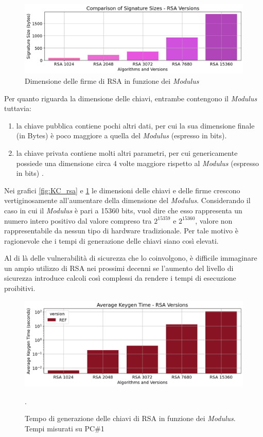 \begin{figure}[H]
    \centering
    \includegraphics[width=1\textwidth]{Immagini/20240822_i9/Message_IO/IO_rsa.png}
    \caption{Dimensione delle firme di RSA in funzione dei \textit{Modulus}}
    \label{fig:IO_rsa}
\end{figure}

Per quanto riguarda la dimensione delle chiavi, entrambe contengono il \textit{Modulus} tuttavia:
\begin{enumerate}
    \item la chiave pubblica contiene pochi altri dati, per cui la sua dimensione finale (in Bytes) è poco maggiore a quella del \textit{Modulus} (espresso in bits).
    \item la chiave privata contiene molti altri parametri, per cui genericamente possiede una dimensione circa 4 volte maggiore rispetto al \textit{Modulus} (espresso in bits) \cite{stackexchange_rsa_2015}.
\end{enumerate}

Nei grafici \ref{fig:KC_rsa} e \ref{fig:IO_rsa} le dimensioni delle chiavi e delle firme crescono vertiginosamente all'aumentare della dimensione del \textit{Modulus}. Considerando il caso in cui il \textit{Modulus} è pari a 15360 bits, vuol dire che esso rappresenta un numero intero positivo dal valore compreso tra \( 2^{15359} \) e \(2^{15360} \), valore non rappresentabile da nessun tipo di hardware tradizionale. Per tale motivo è ragionevole che i tempi di generazione delle chiavi siano così elevati.

Al di là delle vulnerabilità di sicurezza che lo coinvolgono, è difficile immaginare un ampio utilizzo di RSA nei prossimi decenni se l'aumento del livello di sicurezza introduce calcoli così complessi da rendere i tempi di esecuzione proibitivi.

\begin{figure}[H]
    \centering
    \includegraphics[width=1\textwidth]{Immagini/20240822_i9/Time_Keygen/TM_KG_rsa.png}
    \caption{Tempo di generazione delle chiavi di RSA in funzione dei \textit{Modulus}. Tempi misurati su PC\#1}.
    \label{fig:TM_KG_rsa}
\end{figure}

